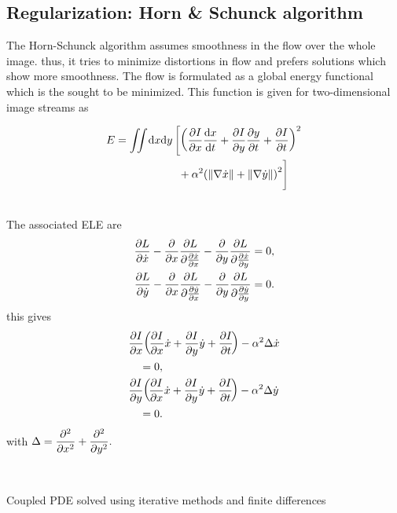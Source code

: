 \begin{compactdesc}
		\section{Regularization: Horn \& Schunck algorithm} 
		The Horn-Schunck algorithm assumes smoothness in the flow over the whole image. thus, it tries to minimize distortions in flow and prefers solutions which show more smoothness. The flow is formulated as a global energy functional which is the sought to be minimized. This function is given for two-dimensional image streams as \\
		\begin{sideways}
			\begin{minipage}[t]{1.2\columnwidth}
				\begin{align}
						E&=\iint_{}^{}\!\dd{x}\!\dd{y}\left[\left( \pdv{I}{x}\dv{x}{t}+\pdv{I}{y}\pdv{y}{t}+\pdv{I}{t} \right)^2\right.\nonumber\\
							&\hphantom{\iint_{}^{}\!\dd{x}\!\dd{y}\left[\right.\quad}\left.\vphantom{\iint_{}^{}\!\dd{x}\!\dd{y}\left[\left( \pdv{I}{x}\dv{x}{t}+\pdv{I}{y}\pdv{y}{t}+\pdv{I}{t} \right)^2\right.}
					+\alpha^2\!\left( \norm{\nabla \dot{x}} +\norm{\nabla\dot{y}}\right)^2  \right]
				\label{eq:2dimstreams}
				\end{align}
			\end{minipage}
		\end{sideways}\\
		The associated ELE are 
		\begin{align*}
			\frac{\partial L}{\partial \dot{x}}-\frac{\partial }{\partial x}\frac{\partial L}{\partial \frac{\partial \dot{x}}{\partial x}}-\frac{\partial }{\partial y}\frac{\partial L}{\partial \frac{\partial \dot{x}}{\partial y}}&=0,\\
			\frac{\partial L}{\partial \dot{y}}-\frac{\partial }{\partial x}\frac{\partial L}{\partial \frac{\partial \dot{y}}{\partial x}}-\frac{\partial }{\partial y}\frac{\partial L}{\partial \frac{\partial \dot{y}}{\partial y}}&=0.
		\end{align*}
			this gives
		\begin{align*}
			&\frac{\partial I}{\partial x}\!\left(\! \frac{\partial I}{\partial x}\dot{x}+\frac{\partial I}{\partial y}\dot{y}+\frac{\partial I}{\partial t} \!\right)-\alpha^2\Delta \dot{x}\\
			&\quad=0,\\
			&\frac{\partial I}{\partial y}\!\left(\! \frac{\partial I}{\partial x}\dot{x}+\frac{\partial I}{\partial y}\dot{y}+\frac{\partial I}{\partial t} \!\right)-\alpha^2\Delta \dot{y}\\
			&\quad=0.
		\end{align*}
		with $\displaystyle\Delta=\frac{\partial^{2} }{\partial x ^{2}}+\frac{\partial^{2} }{\partial y ^{2}}.$
	\item[\lp{Remarks}]\hfill\\
		\begin{enumerate*}[label=\protect\circled{\arabic*},itemjoin=]
			\item Coupled PDE solved using iterative methods and finite differences\\

\end{enumerate*}
\end{compactdesc}

